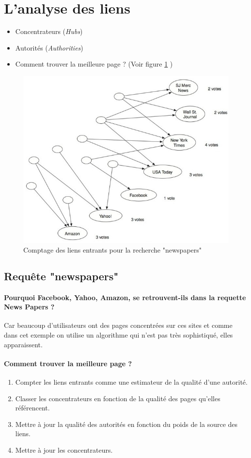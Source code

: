 \section{L'analyse des liens}
\begin{itemize}
\item Concentrateurs (\textit{Hubs})
\item Autorités (\textit{Authorities})
\item Comment trouver la meilleure page ? (Voir figure \ref{fig-14-1}	)
\end{itemize}



\begin{figure}[!ht]
\centering
\includegraphics[width=0.8\linewidth]{images/ref/fig-14-1.jpeg}
\caption{Comptage des liens entrants pour la recherche "newspapers"}
\label{fig-14-1}
\end{figure}

\subsection*{Requête "newspapers"}

\paragraph{Pourquoi Facebook, Yahoo, Amazon, se retrouvent-ils dans la requette News Papers ?}
Car beaucoup d'utilisateurs ont des pages concentrées sur ces sites et comme dans cet exemple on utilise un algorithme qui n'est pas très sophistiqué, elles apparaissent. 

\paragraph{Comment trouver la meilleure page ?}
\begin{enumerate}
\item Compter les liens entrants comme une estimateur de la qualité d'une autorité.
\item Classer les concentrateurs en fonction de la qualité des pages qu'elles référencent.
\item Mettre à jour la qualité des autorités en fonction du poids de la source des liens.
\item Mettre à jour les concentrateurs.
\end{enumerate}

